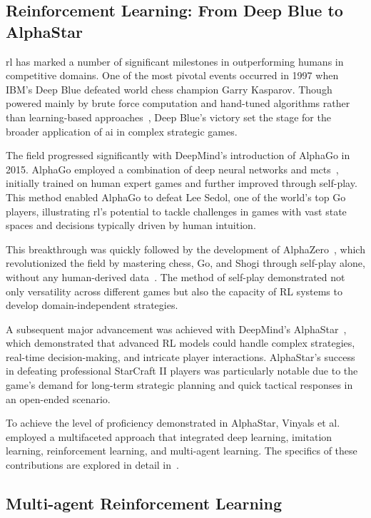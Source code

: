     \subsection*{Reinforcement Learning: From Deep Blue to AlphaStar}%

\Gls{rl} has marked a number of significant milestones in outperforming humans 
in competitive domains. One of the most pivotal events occurred in 1997 
when IBM's Deep Blue defeated world chess champion Garry Kasparov. Though 
powered mainly by brute force computation and hand-tuned algorithms rather than 
learning-based approaches~\cite{campbell2002}, Deep Blue's victory set the 
stage for the broader application of \gls{ai} in complex strategic games.

The field progressed significantly with DeepMind's introduction of AlphaGo 
in 2015. AlphaGo employed a combination of deep neural networks and 
\gls{mcts}~\cite{silver2016}, initially trained on human expert games and 
further improved through self-play.
This method enabled AlphaGo to defeat Lee Sedol, one of the world's top Go 
players, illustrating \gls{rl}'s potential to tackle challenges in games with 
vast state spaces and decisions typically driven by human intuition.

This breakthrough was quickly followed by the development of 
AlphaZero~\cite{silver2017}, which revolutionized the field by mastering chess,
Go, and Shogi through self-play alone, without any human-derived 
data~\cite{silver2017a}. The method of self-play demonstrated not only 
versatility across different games but also the capacity of RL systems to 
develop domain-independent strategies.

A subsequent major advancement was achieved with DeepMind's 
AlphaStar~\cite{vinyals2019}, 
which demonstrated that advanced RL models could handle complex strategies, 
real-time decision-making, and intricate player interactions. 
AlphaStar's success in defeating professional StarCraft II players
was particularly notable due to the game's demand for long-term strategic 
planning and quick tactical responses in an open-ended scenario.

To achieve the level of proficiency demonstrated in AlphaStar, 
Vinyals et al.~\cite{vinyals2019} employed a multifaceted approach 
that integrated deep learning, imitation learning, 
reinforcement learning, and multi-agent learning. 
The specifics of these contributions are explored in detail 
in~.

    \subsection*{Multi-agent Reinforcement Learning}%

